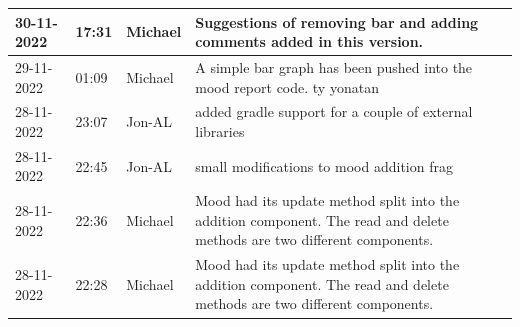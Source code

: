 \documentclass[11pt]{article}
\begin{document}
\begin{center}
\begin{longtable}{|p{2cm}|l|p{2cm}|p{10.5cm}|}
            30-11-2022                                 & 17:31                              & Michael                                 & Suggestions of removing bar and adding comments added in this version.                                                                                                                                                                                                                                       \\ \hline
            29-11-2022                                 & 01:09                              & Michael                                 & A simple bar graph has been pushed into the mood report code. ty yonatan                                                                                                                                                                                                                                     \\ \hline
            28-11-2022                                 & 23:07                              & Jon-AL                                  & added gradle support for a couple of external libraries                                                                                                                                                                                                                                                      \\ \hline
            28-11-2022                                 & 22:45                              & Jon-AL                                  & small modifications to mood addition frag                                                                                                                                                                                                                                                                    \\ \hline
            28-11-2022                                 & 22:36                              & Michael                                 & Mood had its update method split into the addition component. The read and delete methods are two different components.                                                                                                                                                                                      \\ \hline
            28-11-2022                                 & 22:28                              & Michael                                 & Mood had its update method split into the addition component. The read and delete methods are two different components.                                                                                                                                                                                      \\ \hline

\end{longtable}
\end{center}
\end{document}
